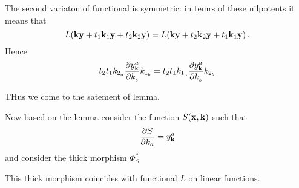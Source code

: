 The second variaton of functional is symmetric: in temrs of these nilpotents
it means that 
    $$
L({\bf k}{\bf y}+t_1{\bf k}_1{\bf y}+t_2{\bf k}_2 {\bf y} )=
L({\bf k}{\bf y}+t_2{\bf k}_2{\bf y}+t_1{\bf k}_1 {\bf y} )\,.
       $$
Hence
      $$ 
 t_2t_1k_{2_{a}}{\partial y^a_{\bf k}\over \partial k_{_{b}}}k_{1_{b}}=
 t_2t_1k_{1_{a}}{\partial y^a_{\bf k}\over \partial k_{_{b}}}k_{2_{b}}
          $$      

THus we come to the satement of lemma.

Now based on the lemma consider the function  $S({\bf x},{\bf k})$ such that
              $$
{\partial S\over \partial k_a}=y^a_{\bf k}
              $$
and consider the thick morphism $\Phi_S^*$

This thick morphism coincides with functional $L$
on linear functions.

\bye
